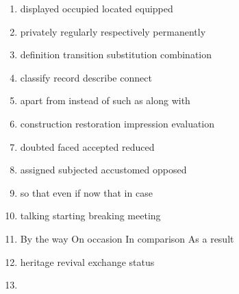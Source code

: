 \begin{enumerate}
\item

\fourchoices
{displayed}
{occupied}
{located}
{equipped}

\item

\fourchoices
{privately}
{regularly}
{respectively}
{permanently}

\item

\fourchoices
{definition}
{transition}
{substitution}
{combination}

\item

\fourchoices
{classify}
{record}
{describe}
{connect}

\item

\fourchoices
{apart from}
{instead of}
{such as}
{along with}

\item

\fourchoices
{construction}
{restoration}
{impression}
{evaluation}

\item

\fourchoices
{doubted}
{faced}
{accepted}
{reduced}

\item

\fourchoices
{assigned}
{subjected}
{accustomed}
{opposed}

\item

\fourchoices
{so that}
{even if}
{now that}
{in case}

\item

\fourchoices
{talking}
{starting}
{breaking}
{meeting}

\item

\fourchoices
{By the way}
{On occasion}
{In comparison}
{As a result}

\item

\fourchoices
{heritage}
{revival}
{exchange}
{status}

\item


\end{enumerate}
